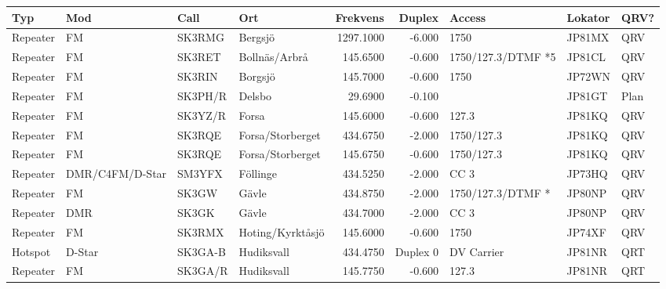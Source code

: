{\begin{landscape}
\begin{longtable}{llllrrlll}
	\bf Typ           & \bf Mod         & \bf Call & \bf Ort             & \bf Frekvens & \bf Duplex & \bf Access         & \bf Lokator & \bf QRV? \\ \hline
	\endhead
Repeater & FM              & SK3RMG   & Bergsjö             &    1297.1000 &     -6.000 & 1750               & JP81MX      & QRV      \\
	Repeater          & FM              & SK3RET   & Bollnäs/Arbrå       &     145.6500 &     -0.600 & 1750/127.3/DTMF *5 & JP81CL      & QRV      \\
	Repeater          & FM              & SK3RIN   & Borgsjö             &     145.7000 &     -0.600 & 1750               & JP72WN      & QRV      \\
	Repeater          & FM              & SK3PH/R  & Delsbo              &      29.6900 &     -0.100 &                    & JP81GT      & Plan     \\
	Repeater          & FM              & SK3YZ/R  & Forsa               &     145.6000 &     -0.600 & 127.3              & JP81KQ      & QRV      \\
	Repeater          & FM              & SK3RQE   & Forsa/Storberget    &     434.6750 &     -2.000 & 1750/127.3         & JP81KQ      & QRV      \\
	Repeater          & FM              & SK3RQE   & Forsa/Storberget    &     145.6750 &     -0.600 & 1750/127.3         & JP81KQ      & QRV      \\
	Repeater          & DMR/C4FM/D-Star & SM3YFX   & Föllinge            &     434.5250 &     -2.000 & CC 3               & JP73HQ      & QRV      \\
	Repeater          & FM              & SK3GW    & Gävle               &     434.8750 &     -2.000 & 1750/127.3/DTMF *  & JP80NP      & QRV      \\
	Repeater          & DMR             & SK3GK    & Gävle               &     434.7000 &     -2.000 & CC 3               & JP80NP      & QRV      \\
	Repeater          & FM              & SK3RMX   & Hoting/Kyrktåsjö    &     145.6000 &     -0.600 & 1750               & JP74XF      & QRV      \\
	Hotspot           & D-Star          & SK3GA-B  & Hudiksvall          &     434.4750 &   Duplex 0 & DV Carrier         & JP81NR      & QRT      \\
	Repeater          & FM              & SK3GA/R  & Hudiksvall          &     145.7750 &     -0.600 & 127.3              & JP81NR      & QRT      \\

\end{longtable}
\end{landscape}}
